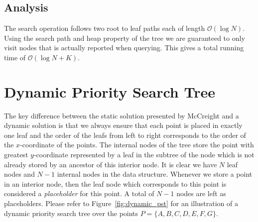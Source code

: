 \documentclass[twoside,11pt,openright]{report}
\begin{document}
\subsection*{Analysis}
The search operation follows two root to leaf paths each of length $\mathcal{O}(\log N)$. Using the search path and heap property of the tree we are guaranteed to only visit nodes that is actually reported when querying. This gives a total running time of $\mathcal{O}(\log N + K)$.

\section{Dynamic Priority Search Tree}
The key difference between the static solution presented by McCreight and a dynamic solution is that we always ensure that each point is placed in exactly one leaf and the order of the leafs from left to right corresponds to the order of the $x$-coordinate of the points. The internal nodes of the tree store the point with greatest $y$-coordinate represented by a leaf in the subtree of the node which is not already stored by an ancestor of this interior node. It is clear we have $N$ leaf nodes and $N-1$ internal nodes in the data structure.
Whenever we store a point in an interior node, then the leaf node which corresponds to this point is considered a \textit{placeholder} for this point. A total of $N - 1$ nodes are left as placeholders. Please refer to Figure~\ref{fig:dynamic_pst} for an illustration of a dynamic priority search tree over the points $P = \{A, B, C, D, E, F, G \}$.
\end{document}
